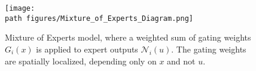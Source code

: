 
\begin{figure}[htbp!]
    \centering
    \texttt{[image: \\path figures/Mixture\_of\_Experts\_Diagram.png]}
    \caption{Mixture of Experts model, where a weighted sum of gating weights \(G_i(x)\) is applied to expert outputs \(\mathcal{N}_i(u)\). The gating weights are spatially localized, depending only on $x$ and not $u$. }
    \label{fig:Mixture_of_Experts}
\end{figure}






